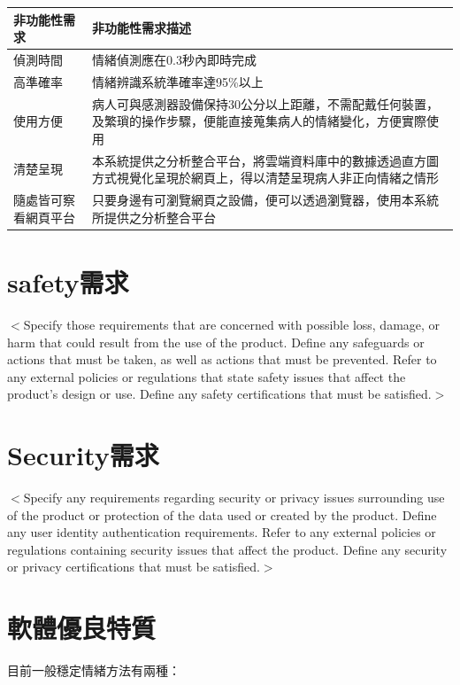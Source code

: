 \documentclass[12pt]{scrreprt}
\begin{document}
\begin{center}  
\begin{tabular}{|l| p{10cm}|}  
\hline  
非功能性需求 & 非功能性需求描述   \\ \hline  
偵測時間 & 情緒偵測應在0.3秒內即時完成    \\ \hline  
高準確率 & 情緒辨識系統準確率達95\%以上 \\ \hline
使用方便 &病人可與感測器設備保持30公分以上距離，不需配戴任何裝置，及繁瑣的操作步驟，便能直接蒐集病人的情緒變化，方便實際使用 \\ \hline
清楚呈現 & 本系統提供之分析整合平台，將雲端資料庫中的數據透過直方圖方式視覺化呈現於網頁上，得以清楚呈現病人非正向情緒之情形 \\ \hline
隨處皆可察看網頁平台 & 只要身邊有可瀏覽網頁之設備，便可以透過瀏覽器，使用本系統所提供之分析整合平台 \\ \hline

\end{tabular}  
\end{center}  

\section{safety需求}
$<$Specify those requirements that are concerned with possible loss, damage, or 
harm that could result from the use of the product. Define any safeguards or 
actions that must be taken, as well as actions that must be prevented. Refer to 
any external policies or regulations that state safety issues that affect the 
product’s design or use. Define any safety certifications that must be 
satisfied.$>$

\section{Security需求}
$<$Specify any requirements regarding security or privacy issues surrounding use 
of the product or protection of the data used or created by the product. Define 
any user identity authentication requirements. Refer to any external policies or 
regulations containing security issues that affect the product. Define any 
security or privacy certifications that must be satisfied.$>$

\section{軟體優良特質}
目前一般穩定情緒方法有兩種：
\end{document}
